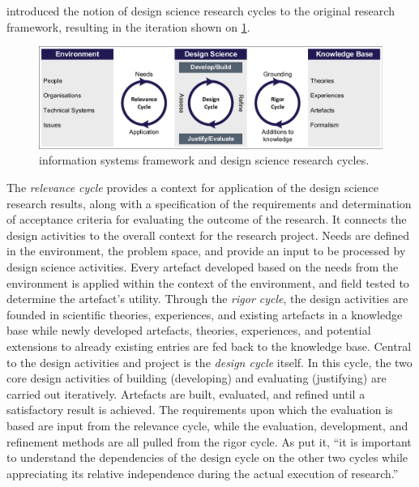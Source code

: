 \textcite{Hevner2007TheTC} introduced the notion of design science research cycles to the original research framework, resulting in the iteration shown on \cref{fig:ISRframework}.
\begin{figure}[tb]
  \centering
  \includegraphics[width=\textwidth, trim=2 2 2 2, clip]{mainmatter/approach/figures/ISRframework.pdf}
  \caption{ information systems framework and design science research cycles.}\label{fig:ISRframework}
\end{figure}
The \emph{relevance cycle} provides a context for application of the design science research results, along with a specification of the requirements and determination of acceptance criteria for evaluating the outcome of the research.
It connects the design activities to the overall context for the research project.
Needs are defined in the environment, \ie{} the problem space, and provide an input to be processed by design science activities.
Every artefact developed based on the needs from the environment is applied within the context of the environment, and field tested to determine the artefact's utility.
Through the \emph{rigor cycle}, the design activities are founded in scientific theories, experiences, and existing artefacts in a knowledge base while newly developed artefacts, theories, experiences, and potential extensions to already existing entries are fed back to the knowledge base.
Central to the design activities and project is the \emph{design cycle} itself.
In this cycle, the two core design activities of building (developing) and evaluating (justifying) are carried out iteratively.
Artefacts are built, evaluated, and refined until a satisfactory result is achieved.
The requirements upon which the evaluation is based are input from the relevance cycle, while the evaluation, development, and refinement methods are all pulled from the rigor cycle.
As \textcite{Hevner2007TheTC} put it, ``it is important to understand the dependencies of the design cycle on the other two cycles while appreciating its relative independence during the actual execution of research.''

